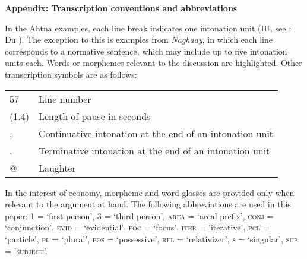 \bigskip


\begin{center}\textbf{Appendix: Transcription conventions and abbreviations}\end{center}

In the Ahtna examples, each line break indicates one intonation unit (IU, see \citealt{DuBois1992}; Du \citealt{DuBois2006}). The exception to this is examples from \textit{Naghaay}, in which each line corresponds to a normative sentence, which may include up to five intonation units each. Words or morphemes relevant to the discussion are highlighted. Other transcription symbols are as follows:

\begin{table}[!h]
    \begin{tabular}{l l }
 57 & Line number\\
(1.4) & Length of pause in seconds\\
, & Continuative intonation at the end of an intonation unit\\
. & Terminative intonation at the end of an intonation unit\\
@ & Laughter\\    \end{tabular}
\end{table}

\noindent
In the interest of economy, morpheme and word glosses are provided only when relevant to the argument at hand. The following abbreviations are used in this paper: \textsc{1} = ‘first person’, \textsc{3} = ‘third person’, \textsc{area} = ‘areal prefix’, \textsc{conj} = ‘conjunction’, \textsc{evid} = ‘evidential’, \textsc{foc} = ‘focus’, \textsc{iter} = 'iterative', \textsc{pcl} = ‘particle’, \textsc{pl} = ‘plural’, \textsc{pos} = ‘possessive’, \textsc{rel} = ‘relativizer’, \textsc{s} = ‘singular’, \textsc{sub} \textsc{=} \textsc{'subject'.}








\label{berez-ch-end}
